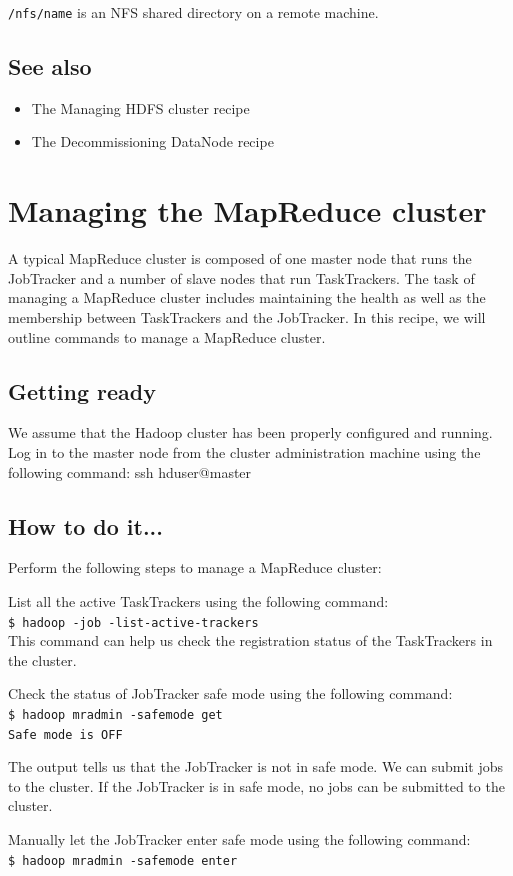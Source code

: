 \verb|/nfs/name| is an NFS shared directory on a remote machine.
\subsection*{See also}
\begin{itemize}
\item The Managing HDFS cluster recipe
\item The Decommissioning DataNode recipe
\end{itemize}

\section{Managing the MapReduce cluster}
A typical MapReduce cluster is composed of one master node that runs the JobTracker and a number of slave nodes that run TaskTrackers. The task of managing a MapReduce cluster includes maintaining the health as well as the membership between TaskTrackers and the JobTracker. In this recipe, we will outline commands to manage a MapReduce cluster.
\subsection*{Getting ready}
We assume that the Hadoop cluster has been properly configured and running.
Log in to the master node from the cluster administration machine using the following command:
ssh hduser@master
\subsection*{How to do it...}
Perform the following steps to manage a MapReduce cluster:

List all the active TaskTrackers using the following command: \\
\verb|$ hadoop -job -list-active-trackers| \\
This command can help us check the registration status of the TaskTrackers in the cluster.

Check the status of JobTracker safe mode using the following command: \\
\verb|$ hadoop mradmin -safemode get| \\
\verb|Safe mode is OFF|

The output tells us that the JobTracker is not in safe mode. We can submit jobs to the cluster. If the JobTracker is in safe mode, no jobs can be submitted to the cluster.

Manually let the JobTracker enter safe mode using the following command: \\
\verb|$ hadoop mradmin -safemode enter|

